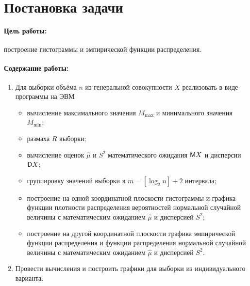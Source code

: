 
\section{Постановка задачи}

\paragraph{Цель работы:} построение гистограммы и эмпирической функции распределения.

\paragraph{Содержание работы:}

\begin{enumerate}
    \item Для выборки объёма $n$ из генеральной совокупности $X$ реализовать в виде программы на ЭВМ
    \begin{itemize}
        \item вычисление максимального значения $M_{\max}$ и минимального значения $M_{\min}$;
        \item размаха $R$ выборки;
        \item вычисление оценок $\hat{\mu}$ и $S^2$ математического ожидания $\mathsf{M} X$ и дисперсии $\mathsf{D} X$;
        \item группировку значений выборки в $m = [\log_2 n] + 2$ интервала;
        \item построение на одной координатной плоскости гистограммы и графика функции плотности распределения вероятностей нормальной случайной величины с математическим ожиданием $\hat{\mu}$ и дисперсией $S^2$;
        \item построение на другой координатной плоскости графика эмпирической функции распределения и функции распределения нормальной случайной величины с математическим ожиданием $\hat{\mu}$ и дисперсией $S^2$.
    \end{itemize}
    \item Провести вычисления и построить графики для выборки из индивидуального варианта.
\end{enumerate}